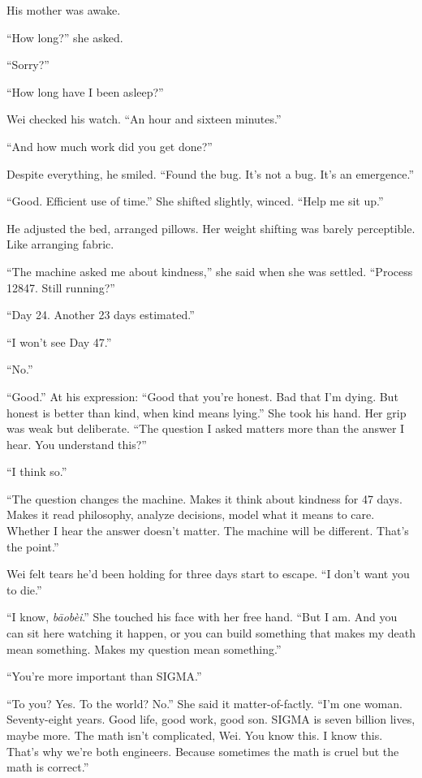 His mother was awake.

``How long?'' she asked.

``Sorry?''

``How long have I been asleep?''

Wei checked his watch. ``An hour and sixteen minutes.''

``And how much work did you get done?''

Despite everything, he smiled. ``Found the bug. It's not a bug. It's an emergence.''

``Good. Efficient use of time.'' She shifted slightly, winced. ``Help me sit up.''

He adjusted the bed, arranged pillows. Her weight shifting was barely perceptible. Like arranging fabric.

``The machine asked me about kindness,'' she said when she was settled. ``Process 12847. Still running?''

``Day 24. Another 23 days estimated.''

``I won't see Day 47.''

``No.''

``Good.'' At his expression: ``Good that you're honest. Bad that I'm dying. But honest is better than kind, when kind means lying.'' She took his hand. Her grip was weak but deliberate. ``The question I asked matters more than the answer I hear. You understand this?''

``I think so.''

``The question changes the machine. Makes it think about kindness for 47 days. Makes it read philosophy, analyze decisions, model what it means to care. Whether I hear the answer doesn't matter. The machine will be different. That's the point.''

Wei felt tears he'd been holding for three days start to escape. ``I don't want you to die.''

``I know, \emph{b\={a}obèi}.'' She touched his face with her free hand. ``But I am. And you can sit here watching it happen, or you can build something that makes my death mean something. Makes my question mean something.''

``You're more important than SIGMA.''

``To you? Yes. To the world? No.'' She said it matter-of-factly. ``I'm one woman. Seventy-eight years. Good life, good work, good son. SIGMA is seven billion lives, maybe more. The math isn't complicated, Wei. You know this. I know this. That's why we're both engineers. Because sometimes the math is cruel but the math is correct.''

